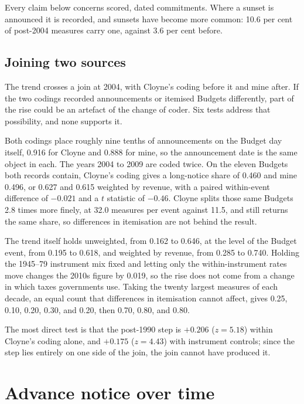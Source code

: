 \documentclass[11pt,a4paper]{article}
\begin{document}
Every claim below concerns scored, dated commitments. Where a sunset is announced it is recorded,
and sunsets have become more common: 10.6 per cent of post-2004 measures carry one, against 3.6 per
cent before.

\subsection{Joining two sources}\label{sec:seam}

The trend crosses a join at 2004, with Cloyne's coding before it and mine after. If the two codings
recorded announcements or itemised Budgets differently, part of the rise could be an artefact of the change of coder. Six tests address that possibility, and none supports it.

Both codings place roughly nine tenths of announcements on the Budget day itself, 0.916 for Cloyne
and 0.888 for mine, so the announcement date is the same object in each. The years 2004 to 2009 are coded twice. On the eleven Budgets both records contain, Cloyne's coding gives a long-notice
share of 0.460 and mine 0.496, or 0.627 and 0.615 weighted by revenue, with a paired within-event
difference of $-0.021$ and a $t$ statistic of $-0.46$. Cloyne splits those same Budgets 2.8 times more finely, at 32.0 measures per event against 11.5, and still returns the same share, so differences in itemisation are not behind the result.

The trend itself holds unweighted, from 0.162 to 0.646, at the level of the Budget event, from 0.195
to 0.618, and weighted by revenue, from 0.285 to 0.740. Holding the 1945--79 instrument mix fixed
and letting only the within-instrument rates move changes the 2010s figure by 0.019, so the rise
does not come from a change in which taxes governments use. Taking the twenty largest measures of
each decade, an equal count that differences in itemisation cannot affect, gives 0.25, 0.10, 0.20,
0.30, and 0.20, then 0.70, 0.80, and 0.80.

The most direct test is that the post-1990 step is $+0.206$ ($z = 5.18$) within Cloyne's coding
alone, and $+0.175$ ($z = 4.43$) with instrument controls; since the step lies entirely on one side
of the join, the join cannot have produced it.

\section{Advance notice over time}\label{sec:trend}
\end{document}
